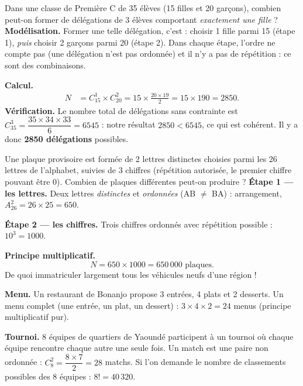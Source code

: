 \documentclass[11pt]{article}
\begin{document}
\begin{exoresolu}
Dans une classe de Première C de 35 élèves (15 filles et 20 garçons), combien peut-on former de délégations de 3 élèves comportant \emph{exactement une fille} ?
\tcblower
\textbf{Modélisation.} Former une telle délégation, c'est : choisir 1 fille parmi 15 (étape 1), \emph{puis} choisir 2 garçons parmi 20 (étape 2). Dans chaque étape, l'ordre ne compte pas (une délégation n'est pas ordonnée) et il n'y a pas de répétition : ce sont des combinaisons.

\textbf{Calcul.}
\begin{align*}
N &= C_{15}^1 \times C_{20}^2 = 15 \times \frac{20 \times 19}{2} = 15 \times 190 = 2850.
\end{align*}
\textbf{Vérification.} Le nombre total de délégations sans contrainte est $C_{35}^3 = \dfrac{35 \times 34 \times 33}{6} = 6545$ : notre résultat $2850 < 6545$, ce qui est cohérent. Il y a donc \textbf{2850 délégations} possibles.
\end{exoresolu}

\begin{exoresolu}
Une plaque provisoire est formée de 2 lettres distinctes choisies parmi les 26 lettres de l'alphabet, suivies de 3 chiffres (répétition autorisée, le premier chiffre pouvant être 0). Combien de plaques différentes peut-on produire ?
\tcblower
\textbf{Étape 1 — les lettres.} Deux lettres \emph{distinctes} et \emph{ordonnées} (AB $\neq$ BA) : arrangement, $A_{26}^2 = 26 \times 25 = 650$.

\textbf{Étape 2 — les chiffres.} Trois chiffres ordonnés avec répétition possible : $10^3 = 1000$.

\textbf{Principe multiplicatif.}
\[ N = 650 \times 1000 = 650\,000 \text{ plaques.} \]
De quoi immatriculer largement tous les véhicules neufs d'une région !
\end{exoresolu}

\begin{exemplebox}
\textbf{Menu.} Un restaurant de Bonanjo propose 3 entrées, 4 plats et 2 desserts. Un menu complet (une entrée, un plat, un dessert) : $3 \times 4 \times 2 = 24$ menus (principe multiplicatif pur).

\textbf{Tournoi.} 8 équipes de quartiers de Yaoundé participent à un tournoi où chaque équipe rencontre chaque autre une seule fois. Un match est une paire non ordonnée : $C_8^2 = \dfrac{8 \times 7}{2} = 28$ matchs. Si l'on demande le nombre de classements possibles des 8 équipes : $8! = 40\,320$.
\end{exemplebox}
\end{document}

